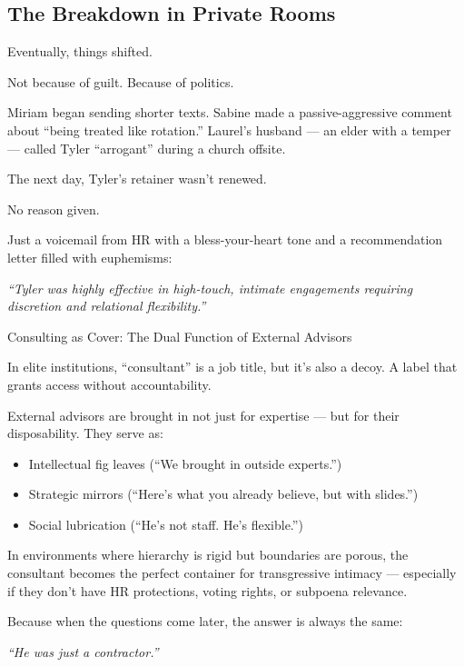 \subsection{The Breakdown in Private Rooms}

Eventually, things shifted.

Not because of guilt.  
Because of politics.

Miriam began sending shorter texts.  
Sabine made a passive-aggressive comment about “being treated like rotation.”  
Laurel’s husband — an elder with a temper — called Tyler “arrogant” during a church offsite.

The next day, Tyler’s retainer wasn’t renewed.

No reason given.

Just a voicemail from HR with a bless-your-heart tone and a recommendation letter filled with euphemisms:

\textit{“Tyler was highly effective in high-touch, intimate engagements requiring discretion and relational flexibility.”}

\begin{HistoricalSidebar}{Consulting as Cover: The Dual Function of External Advisors}

    In elite institutions, “consultant” is a job title, but it’s also a decoy.
    A label that grants access without accountability.
    
    External advisors are brought in not just for expertise — but for their disposability.
    They serve as:
    
    \begin{itemize}
    \item Intellectual fig leaves (“We brought in outside experts.”)
    \item Strategic mirrors (“Here’s what you already believe, but with slides.”)
    \item Social lubrication (“He’s not staff. He’s flexible.”)
    \end{itemize}
    
    In environments where hierarchy is rigid but boundaries are porous, the consultant becomes the perfect container for transgressive intimacy — especially if they don’t have HR protections, voting rights, or subpoena relevance.
    
    Because when the questions come later, the answer is always the same:
    
    \textit{“He was just a contractor.”}
    
\end{HistoricalSidebar}

